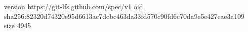 version https://git-lfs.github.com/spec/v1
oid sha256:82320d74320e95d6613ac7dcbc463da33fd570c90fd6c70da9e5e427eae3a109
size 4945
